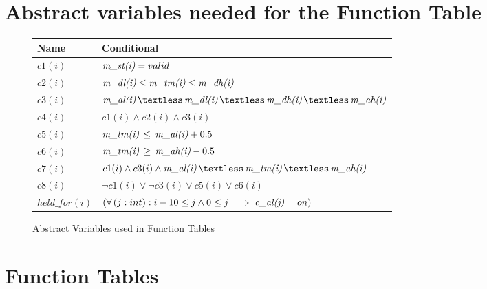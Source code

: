 \section{Abstract variables needed for the Function Table}

\begin{figure}[!htb]
\begin{center}
\begin{tabular}{|l|l|}
\hline
Name      & Conditional                                                       \\ \hline
$c1(i)$     & $\textit{m\_st(i)} = valid$                                                  \\ \hline
$c2(i)$     & $\textit{m\_dl(i)} \le \textit{m\_tm(i)} \le \textit{m\_dh(i)} $\\ \hline
$c3(i)$     & $\mv{al(i)}\,\textless\,\mv{dl(i)}\,\textless\,\mv{dh(i)}\,\textless\,\mv{ah(i)}$ \\ \hline
$c4(i)$     & $c1(i) \land c2(i) \land c3(i) $\\ \hline
$c5(i)$     & $\textit{m\_tm(i)}\,\le\,\textit{m\_al(i)} + 0.5$\\ \hline
$c6(i)$     & $\textit{m\_tm(i)}\,\ge\,\textit{m\_ah(i)} - 0.5$\\ \hline
$c7(i)$     & $c1(i) \land c3(i) \land \mv{al(i)}\,\textless\,\mv{tm(i)}\,\textless\,\mv{ah(i)}$\\ \hline
$c8(i)$     & $\neg c1(i) \lor \neg c3(i) \lor c5(i) \lor c6(i)$\\ \hline
$held\_for(i)$ & $(\forall\,(j: int): i - 10 \le j \land 0 \le j \implies \textit{c\_al(j)} = on)$\\ \hline
\end{tabular}
\caption{Abstract Variables used in Function Tables}
\label{conditionals}
\end{center}
\end{figure}

\section{Function Tables}
